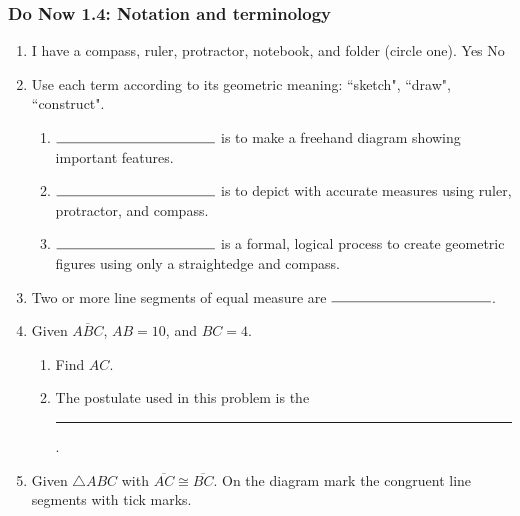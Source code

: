 \documentclass[12pt, oneside]{article}
\begin{document}
\newpage
\subsubsection*{Do Now 1.4: Notation and terminology}
  \begin{enumerate}
    \item I have a compass, ruler, protractor, notebook, and folder (circle one). Yes \qquad No

    \item Use each term according to its geometric meaning: ``sketch", ``draw", ``construct".
    \begin{enumerate}
      \item $\rule{4cm}{0.15mm}$ is to make a freehand diagram showing important features. \smallskip
      \item $\rule{4cm}{0.15mm}$ is to depict with accurate measures using ruler, protractor, and compass. \smallskip
      \item $\rule{4cm}{0.15mm}$ is a formal, logical process to create geometric figures using only a straightedge and compass.
    \end{enumerate} \smallskip

  \item Two or more line segments of equal measure are $\rule{4cm}{0.15mm}$.
    \bigskip
  \item Given $\overline{ABC}$, $AB=10$, and $BC=4$.
  \begin{enumerate}
    \item Find ${AC}$.\\[0.75cm]
       \smallskip
    \item The postulate used in this problem is the \rule{6cm}{0.15mm}.
  \end{enumerate}
  \smallskip

  \item Given $\triangle ABC$ with $\overline{AC} \cong \overline{BC}$. On the diagram mark the congruent line segments with tick marks.
  \begin{center}
  \end{center}


\end{enumerate}
\end{document}
